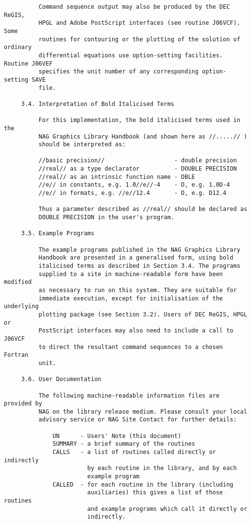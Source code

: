\begin{verbatim}
          Command sequence output may also be produced by the DEC ReGIS,
          HPGL and Adobe PostScript interfaces (see routine J06VCF). Some
          routines for contouring or the plotting of the solution of ordinary
          differential equations use option-setting facilities. Routine J06VEF
          specifies the unit number of any corresponding option-setting SAVE
          file.

     3.4. Interpretation of Bold Italicised Terms

          For this implementation, the bold italicised terms used in the
          NAG Graphics Library Handbook (and shown here as //.....// )
          should be interpreted as:

          //basic precision//                    - double precision
          //real// as a type declarator          - DOUBLE PRECISION
          //real// as an intrinsic function name - DBLE
          //e// in constants, e.g. 1.0//e//-4    - D, e.g. 1.0D-4
          //e// in formats, e.g. //e//12.4       - D, e.g. D12.4

          Thus a parameter described as //real// should be declared as
          DOUBLE PRECISION in the user's program.

     3.5. Example Programs

          The example programs published in the NAG Graphics Library
          Handbook are presented in a generalised form, using bold
          italicised terms as described in Section 3.4. The programs
          supplied to a site in machine-readable form have been modified
          as necessary to run on this system. They are suitable for
          immediate execution, except for initialisation of the underlying
          plotting package (see Section 3.2). Users of DEC ReGIS, HPGL or
          PostScript interfaces may also need to include a call to J06VCF
          to direct the resultant command sequences to a chosen Fortran
          unit.

     3.6. User Documentation

          The following machine-readable information files are provided by
          NAG on the library release medium. Please consult your local
          advisory service or NAG Site Contact for further details:

              UN      - Users' Note (this document)
              SUMMARY - a brief summary of the routines
              CALLS   - a list of routines called directly or indirectly
                        by each routine in the library, and by each
                        example program
              CALLED  - for each routine in the library (including
                        auxiliaries) this gives a list of those routines
                        and example programs which call it directly or
                        indirectly.


\end{verbatim}
